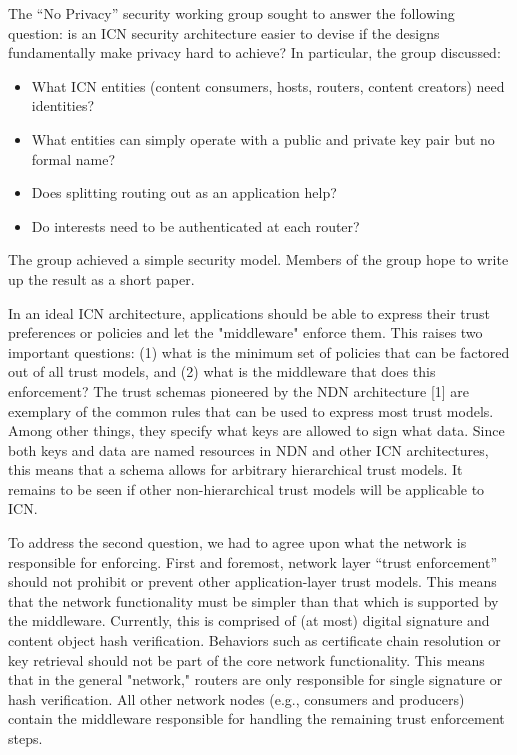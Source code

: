 \documentclass[a4paper,UKenglish]{dagrep}
\begin{document}
\license

The ``No Privacy'' security working group sought to answer the following question: is an ICN security architecture easier to devise if the designs fundamentally make privacy hard to achieve? In particular, the group discussed:

\begin{itemize}
\item What ICN entities (content consumers, hosts, routers, content creators) need identities?
\item What entities can simply operate with a public and private key pair but no formal name?
\item Does splitting routing out as an application help?
\item Do interests need to be authenticated at each router?
\end{itemize}

The group achieved a simple security model. Members of the group hope to write up the result as a short paper.

\license

In an ideal ICN architecture, applications should be able to express their trust preferences or policies and let the "middleware" enforce them. This raises two important questions: (1) what is the minimum set of policies that can be factored out of all trust models, and (2) what is the middleware that does this enforcement? The trust schemas pioneered by the NDN architecture [1] are exemplary of the common rules that can be used to express most trust models. Among other things, they specify what keys are allowed to sign what data. Since both keys and data are named resources in NDN and other ICN architectures, this means that a schema allows for arbitrary hierarchical trust models. It remains to be seen if other non-hierarchical trust models will be applicable to ICN.

To address the second question, we had to agree upon what the network is responsible for enforcing.
First and foremost, network layer ``trust enforcement'' should not prohibit or prevent other application-layer trust models. This means that the network functionality must be simpler than that which is supported by the middleware. Currently, this is comprised of (at most) digital signature and content object hash verification. Behaviors such as certificate chain resolution or key retrieval should not be part of the core network functionality. This means that in the general "network," routers are only responsible for single signature or hash verification. All other network nodes (e.g., consumers and producers) contain the middleware responsible for handling the remaining trust enforcement steps.
\end{document}

